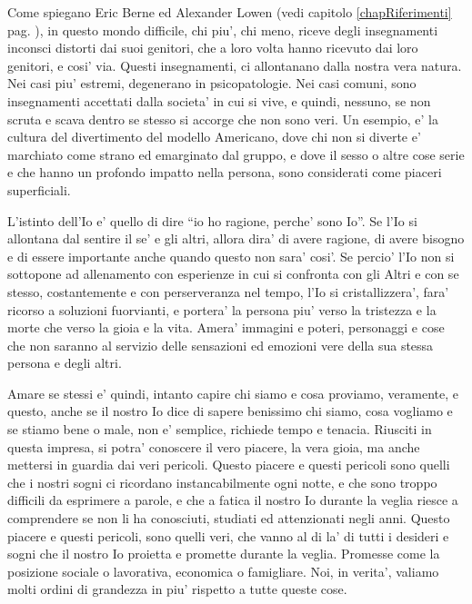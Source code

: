 Come spiegano Eric Berne ed Alexander Lowen (vedi capitolo \ref{chapRiferimenti} pag. \pageref{chapRiferimenti}), in questo mondo difficile, chi piu', chi meno, riceve degli insegnamenti inconsci distorti dai suoi genitori, che a loro volta hanno ricevuto dai loro genitori, e cosi' via. Questi insegnamenti, ci allontanano dalla nostra vera natura. Nei casi piu' estremi, degenerano in psicopatologie. Nei casi comuni, sono insegnamenti accettati dalla societa' in cui si vive, e quindi, nessuno, se non scruta e scava dentro se stesso si accorge che non sono veri. Un esempio, e' la cultura del divertimento del modello Americano, dove chi non si diverte e' marchiato come strano ed emarginato dal gruppo, e dove il sesso o altre cose serie e che hanno un profondo impatto nella persona, sono considerati come piaceri superficiali.

L'istinto dell'Io e' quello di dire ``io ho ragione, perche' sono Io''. Se l'Io si allontana dal sentire il se' e gli altri, allora dira' di avere ragione, di avere bisogno e di essere importante anche quando questo non sara' cosi'. Se percio' l'Io non si sottopone ad allenamento con esperienze in cui si confronta con gli Altri e con se stesso, costantemente e con perserveranza nel tempo, l'Io si cristallizzera', fara' ricorso a soluzioni fuorvianti, e portera' la persona piu' verso la tristezza e la morte che verso la gioia e la vita. Amera' immagini e poteri, personaggi e cose che non saranno al servizio delle sensazioni ed emozioni vere della sua stessa persona e degli altri.

Amare se stessi e' quindi, intanto capire chi siamo e cosa proviamo, veramente, e questo, anche se il nostro Io dice di sapere benissimo chi siamo, cosa vogliamo e se stiamo bene o male, non e' semplice, richiede tempo e tenacia. Riusciti in questa impresa, si potra' conoscere il vero piacere, la vera gioia, ma anche mettersi in guardia dai veri pericoli. Questo piacere e questi pericoli sono quelli che i nostri sogni ci ricordano instancabilmente ogni notte, e che sono troppo difficili da esprimere a parole, e che a fatica il nostro Io durante la veglia riesce a comprendere se non li ha conosciuti, studiati ed attenzionati negli anni. Questo piacere e questi pericoli, sono quelli veri, che vanno al di la' di tutti i desideri e sogni che il nostro Io proietta e promette durante la veglia. Promesse come la posizione sociale o lavorativa, economica o famigliare. Noi, in verita', valiamo molti ordini di grandezza in piu' rispetto a tutte queste cose.

